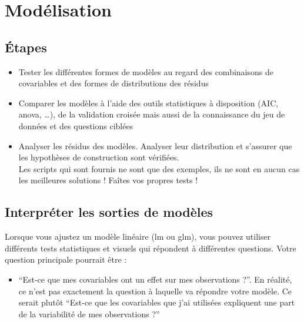 \documentclass[french,a4paper]{article}
\providecommand{\tightlist}{%
  \setlength{\itemsep}{0pt}\setlength{\parskip}{0pt}}
\begin{document}
\hypertarget{modelisation}{%
\section{Modélisation}\label{modelisation}}

\hypertarget{etapes-1}{%
\subsection{Étapes}\label{etapes-1}}


\begin{itemize}
\tightlist
\item
  Tester les différentes formes de modèles au regard des combinaisons de
  covariables et des formes de distributions des résidus
\item
  Comparer les modèles à l'aide des outils statistiques à disposition
  (AIC, anova, \ldots{}), de la validation croisée mais aussi de la
  connaissance du jeu de données et des questions ciblées
\item
  Analyser les résidus des modèles. Analyser leur distribution et
  s'assurer que les hypothèses de construction sont vérifiées.\\
  \nopandoc{\begin{redbox}} Les scripts qui sont fournis ne sont que des
  exemples, ils ne sont en aucun cas les meilleures solutions ! Faîtes
  vos propres tests ! \nopandoc{\end{redbox}}
\end{itemize}

\hypertarget{interpreter-les-sorties-de-modeles}{%
\subsection{Interpréter les sorties de
modèles}\label{interpreter-les-sorties-de-modeles}}

Lorsque vous ajustez un modèle linéaire (lm ou glm), vous pouvez
utiliser différents tests statistiques et visuels qui répondent à
différentes questions. Votre question principale pourrait être :

\begin{itemize}
\tightlist
\item
  ``Est-ce que mes covariables ont un effet sur mes observations ?''. En
  réalité, ce n'est pas exactement la question à laquelle va répondre
  votre modèle. Ce serait plutôt ``Est-ce que les covariables que j'ai
  utilisées expliquent une part de la variabilité de mes observations
  ?''
\end{itemize}
\end{document}
